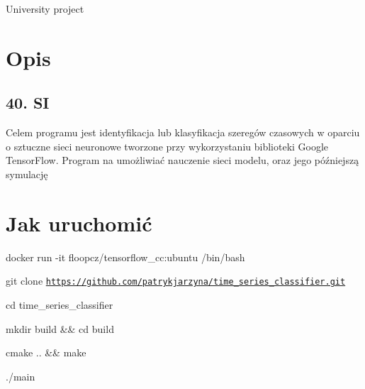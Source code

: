 University project

\section*{Opis}

\subsection*{40. SI}

Celem programu jest identyfikacja lub klasyfikacja szeregów czasowych w oparciu o sztuczne sieci neuronowe tworzone przy wykorzystaniu biblioteki Google Tensor\+Flow. Program na umożliwiać nauczenie sieci modelu, oraz jego późniejszą symulację

\section*{Jak uruchomić}


\begin{DoxyEnumerate}
\item docker run -\/it floopcz/tensorflow\+\_\+cc\+:ubuntu /bin/bash
\item git clone \href{https://github.com/patrykjarzyna/time_series_classifier.git}{\tt https\+://github.\+com/patrykjarzyna/time\+\_\+series\+\_\+classifier.\+git}
\item cd time\+\_\+series\+\_\+classifier
\item mkdir build \&\& cd build
\item cmake .. \&\& make
\item ./main 
\end{DoxyEnumerate}